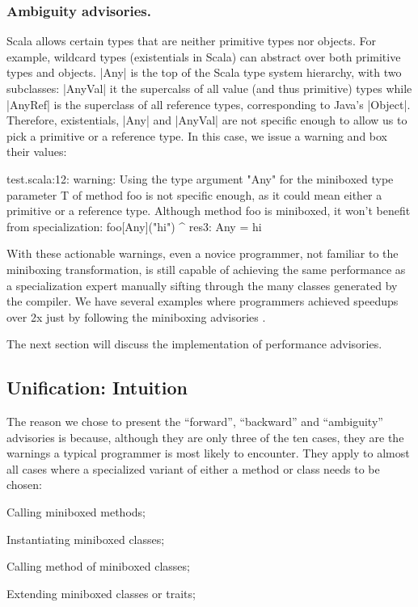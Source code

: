 \subsubsection{Ambiguity advisories.} Scala allows certain types that are neither primitive types nor objects. For example, wildcard types (existentials in Scala) can abstract over both primitive types and objects. |Any| is the top of the Scala type system hierarchy, with two subclasses: |AnyVal| it the supercalss of all value (and thus primitive) types while |AnyRef| is the superclass of all reference types, corresponding to Java's |Object|. Therefore, existentials, |Any| and |AnyVal| are not specific enough to allow us to pick a primitive or a reference type. In this case, we issue a warning and box their values:

\begin{lstlisting-nobreak-nolang}
test.scala:12: warning: Using the type argument "Any" for the miniboxed type parameter T of method foo is not specific enough, as it could mean either a primitive or a reference type. Although method foo is miniboxed, it won't benefit from specialization:
              foo[Any]("hi")
                   ^
res3: Any = hi
\end{lstlisting-nobreak-nolang}

With these actionable warnings, even a novice programmer, not familiar to the miniboxing transformation, is still capable of achieving the same performance as a specialization expert manually sifting through the many classes generated by the compiler. We have several examples where programmers achieved speedups over 2x just by following the miniboxing advisories \cite{miniboxing-www}.

The next section will discuss the implementation of performance advisories.

\subsection{Unification: Intuition}

The reason we chose to present the ``forward'', ``backward'' and ``ambiguity'' advisories is because, although they are only three of the ten cases, they are the warnings a typical programmer is most likely to encounter. They apply to almost all cases where a specialized variant of either a method or class needs to be chosen:

\begin{compactitem}
 \item Calling miniboxed methods;
 \item Instantiating miniboxed classes;
 \item Calling method of miniboxed classes;
 \item Extending miniboxed classes or traits;
\end{compactitem}

